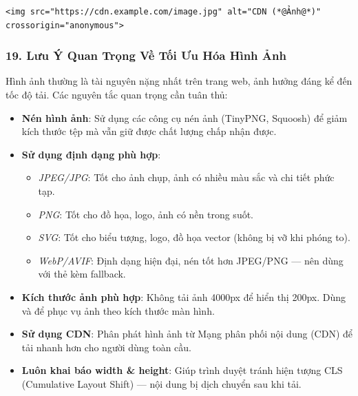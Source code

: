 \begin{codeWindow}
\begin{lstlisting}[language=HTML5]
<img src="https://cdn.example.com/image.jpg" alt="CDN (*@Ảnh@*)" crossorigin="anonymous">
\end{lstlisting}
\end{codeWindow}

\subsubsection{19. Lưu Ý Quan Trọng Về Tối Ưu Hóa Hình Ảnh}

Hình ảnh thường là tài nguyên nặng nhất trên trang web, ảnh hưởng đáng kể đến tốc độ tải. Các nguyên tắc quan trọng cần tuân thủ:

\begin{itemize}[leftmargin=1.5em, itemsep=4pt, parsep=0pt]
    \item \textbf{Nén hình ảnh}: Sử dụng các công cụ nén ảnh (TinyPNG, Squoosh) để giảm kích thước tệp mà vẫn giữ được chất lượng chấp nhận được.
    \item \textbf{Sử dụng định dạng phù hợp}:
    \begin{itemize}[leftmargin=1.2em, itemsep=1pt, parsep=0pt]
        \item \textit{JPEG/JPG}: Tốt cho ảnh chụp, ảnh có nhiều màu sắc và chi tiết phức tạp.
        \item \textit{PNG}: Tốt cho đồ họa, logo, ảnh có nền trong suốt.
        \item \textit{SVG}: Tốt cho biểu tượng, logo, đồ họa vector (không bị vỡ khi phóng to).
        \item \textit{WebP/AVIF}: Định dạng hiện đại, nén tốt hơn JPEG/PNG — nên dùng với thẻ  kèm fallback.
    \end{itemize}
    \item \textbf{Kích thước ảnh phù hợp}: Không tải ảnh 4000px để hiển thị 200px. Dùng  và  để phục vụ ảnh theo kích thước màn hình.
    \item \textbf{Sử dụng CDN}: Phân phát hình ảnh từ Mạng phân phối nội dung (CDN) để tải nhanh hơn cho người dùng toàn cầu.
    \item \textbf{Luôn khai báo width \& height}: Giúp trình duyệt tránh hiện tượng CLS (Cumulative Layout Shift) — nội dung bị dịch chuyển sau khi tải.
\end{itemize}

